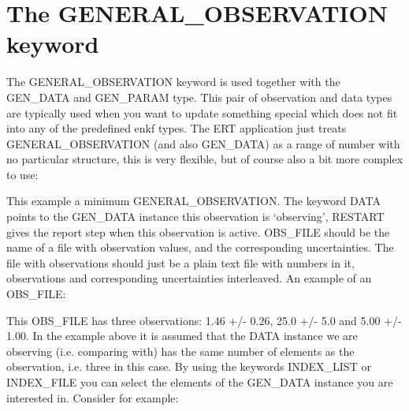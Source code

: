 \documentclass[letterpaper,10pt,english]{sphinxmanual}
\begin{document}
\section{The GENERAL\_OBSERVATION keyword}
\label{\detokenize{observations/index:the-general-observation-keyword}}
The GENERAL\_OBSERVATION keyword is used together with the GEN\_DATA and
GEN\_PARAM type. This pair of observation and data types are typically
used when you want to update something special which does not fit into
any of the predefined enkf types. The ERT application just treats
GENERAL\_OBSERVATION (and also GEN\_DATA) as a range of number with no
particular structure, this is very flexible, but of course also a bit
more complex to use:

%
\begin{sphinxVerbatim}[commandchars=\\\{\}]
 
         
      
     
\end{sphinxVerbatim}

This example a minimum GENERAL\_OBSERVATION. The keyword DATA points to
the GEN\_DATA instance this observation is ‘observing’, RESTART gives
the report step when this observation is active. OBS\_FILE should be
the name of a file with observation values, and the corresponding
uncertainties. The file with observations should just be a plain text
file with numbers in it, observations and corresponding uncertainties
interleaved. An example of an OBS\_FILE:

%
\begin{sphinxVerbatim}[commandchars=\\\{\}]
 
 
 
\end{sphinxVerbatim}

This OBS\_FILE has three observations: 1.46 +/- 0.26, 25.0 +/- 5.0 and
5.00 +/- 1.00. In the example above it is assumed that the DATA
instance we are observing (i.e. comparing with) has the same number of
elements as the observation, i.e. three in this case. By using the
keywords INDEX\_LIST or INDEX\_FILE you can select the elements of the
GEN\_DATA instance you are interested in. Consider for example:
\end{document}
